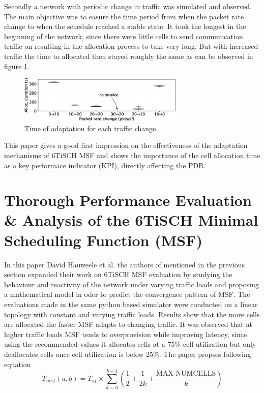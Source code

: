 \documentclass{comnets-thesis}
\begin{document}
Secondly a network with periodic change in traffic was simulated and observed. The main objective was to easure the time period from when the packet rate change to when the schedule reached a stable state. It took the longest in the beginning of the network, since there were little cells to send communication traffic on resulting in the allocation process to take very long. But with increased traffic the time to allocated then stayed roughly the same as can be observed in figure \ref{fig:6p-add-time-length-relation-pdr-dynamic}.
\begin{figure}
    \centering
    \includegraphics[width=0.7\textwidth]{./images/pushing 6tisch msf to the limits - 6p add length time graph (dynamic traffic).png}
    \caption{Time of adaptation for each traffic change.}
    \label{fig:6p-add-time-length-relation-pdr-dynamic}
\end{figure}

This paper gives a good first impression on the effectiveness of the adaptation mechanisms of 6TiSCH MSF and shows the importance of the cell allocation time as a key performace indicator (KPI), directly affecting the PDR.


\section{Thorough Performance Evaluation \& Analysis of the 6TiSCH Minimal Scheduling Function (MSF)}
In this paper \cite{sixp-add-picture} David Hauweele et al. the authors of \cite{PushingMSFToTheLimits} mentioned in the previous section expanded their work on \ac{6TiSCH} \ac{MSF} evaluation by studying the behaviour and reactivity of the network under varying traffic loads and proposing a mathematical model in oder to predict the convergence pattern of \ac{MSF}.
The evaluations made in the same python based simulator were conducted on a linear topology with constant and varying traffic loads. Results show that the more cells are allocated the faster \ac{MSF} adapts to changing traffic. It was observed that at higher traffic loads \ac{MSF} tends to overprovision while improving latency, since using the recommended values it allocates cells at a 75\% cell utilization but only deallocates cells once cell utilization is below 25\%.
The paper propses following equation
\begin{equation}
    T_{msf}(a, b) = T_{sf} \times \sum_{k=a}^{b-1} \left( \frac{1}{2} + \frac{1}{2k} + \frac{\text{MAX NUMCELLS}}{k} \right)
    \label{eq:t_msf}
\end{equation}
\end{document}
